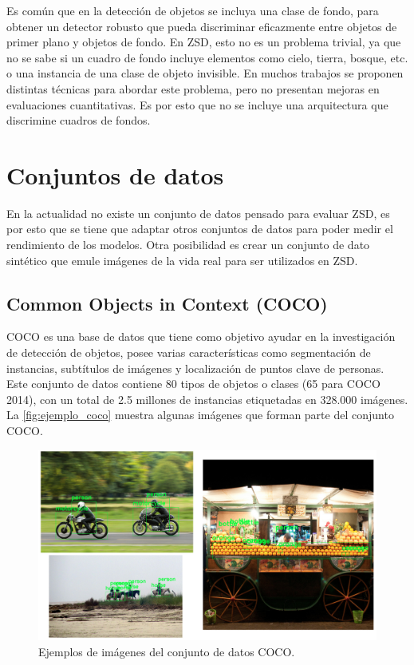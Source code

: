 Es común que en la detección de objetos se incluya una clase de fondo, para obtener un detector robusto que pueda discriminar eficazmente entre objetos de primer plano y objetos de fondo. En ZSD, esto no es un problema trivial, ya que no se sabe si un cuadro de fondo incluye elementos como cielo, tierra, bosque, etc. o una instancia de una clase de objeto invisible. En muchos trabajos \cite{rahman2018zero, bansal2018zero} se proponen distintas técnicas para abordar este problema, pero no presentan mejoras en evaluaciones cuantitativas. Es por esto que no se incluye una arquitectura que discrimine cuadros de fondos.

\section{Conjuntos de datos} \label{sec:conjuntosdedatos}

En la actualidad no existe un conjunto de datos pensado para evaluar ZSD, es por esto que se tiene que adaptar otros conjuntos de datos para poder medir el rendimiento de los modelos. Otra posibilidad es crear un conjunto de dato sintético que emule imágenes de la vida real para ser utilizados en ZSD.

\subsection{Common Objects in Context (COCO)}\label{ssec:commonobjectsincontext}

COCO es una base de datos que tiene como objetivo ayudar en la investigación de detección de objetos, posee varias características como segmentación de instancias, subtítulos de imágenes y localización de puntos clave de personas. Este conjunto de datos contiene 80 tipos de objetos o  clases (65 para COCO 2014), con un total de 2.5 millones de instancias etiquetadas en 328.000 imágenes. La \autoref{fig:ejemplo_coco} muestra algunas imágenes que forman parte del conjunto COCO.

\begin{figure}
	\begin{center}
		\centering
		\includegraphics[width=1\textwidth]{img/coco_ejemplo.png}
		\caption{Ejemplos de imágenes del conjunto de datos COCO.}
		\label{fig:ejemplo_coco}
	\end{center}	
\end{figure}

